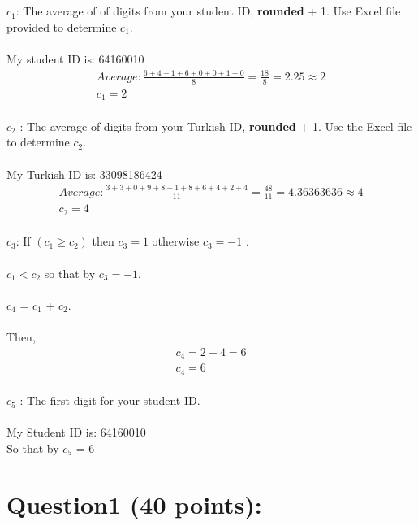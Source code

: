 \documentclass[a4paper, 11pt]{report}
\begin{document}
{
\\ \\
$c_1$: The average of of digits from your student ID, \textbf{rounded} + 1. Use Excel file provided
to determine $c_1$.
\\ \\ My student ID is: 64160010
\begin{align*}
Average : \frac{6+4+1+6+0+0+1+0}{8} = \frac{18}{8} = 2.25 \approx 2 \\
c_1 = 2
\end{align*}
\\
$c_2$ : The average of digits from your Turkish ID, \textbf{rounded} + 1. Use the Excel file to determine $c_2$.
\\ \\
My Turkish ID is: 33098186424
\begin{align*}
Average: \frac{3+3+0+9+8+1+8+6+4+2+4}{11} = \frac{48}{11} = 4.36363636 \approx 4 \\
c_2 = 4
\end{align*}
\\
$c_3$: If $(c_1 \geq c_2)$ then $c_3 = 1$ otherwise $c_3 = -1$ .
\\ \\
$c_1 < c_2$ so that by $c_3 = -1$.
\\ \\
$c_4$ = $c_1$ + $c_2$.
\\ \\
Then,
\begin{align*}
c_4 = 2 + 4 = 6\\
c_4 = 6
\end{align*}
\\
$c_5$ : The first digit for your student ID.
\\ \\
My Student ID is: 64160010
\\ So that by $c_5$ = 6
\newpage
\section*{\textbf{Question1 (40 points):}}

}
\end{document}

